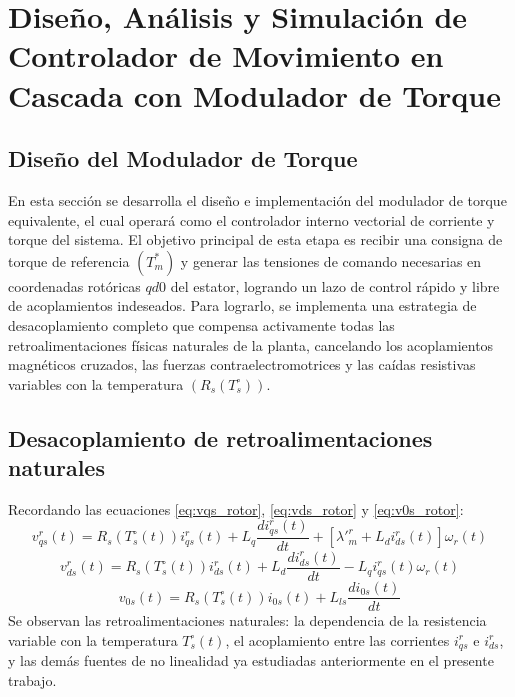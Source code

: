 \documentclass[12pt, a4paper,journal, onecolumn, compsoc]{IEEEtran}
\begin{document}


\section{Diseño, Análisis y Simulación de Controlador de Movimiento en Cascada con Modulador de Torque}
\subsection{Diseño del Modulador de Torque}

En esta sección se desarrolla el diseño e implementación del modulador de torque equivalente, el cual operará como el controlador interno vectorial de corriente y torque del sistema. El objetivo principal de esta etapa es recibir una consigna de torque de referencia $(T_m^*)$ y generar las tensiones de comando necesarias en coordenadas rotóricas \(qd0\) del estator, logrando un lazo de control rápido y libre de acoplamientos indeseados. Para lograrlo, se implementa una estrategia de desacoplamiento completo que compensa activamente todas las retroalimentaciones físicas naturales de la planta, cancelando los acoplamientos magnéticos cruzados, las fuerzas contraelectromotrices y las caídas resistivas variables con la temperatura $(R_s(T_s^\circ))$.
\subsection{Desacoplamiento de retroalimentaciones naturales}
Recordando las ecuaciones \eqref{eq:vqs_rotor}, \eqref{eq:vds_rotor} y \eqref{eq:v0s_rotor}:
    \begin{equation*}
        v^r_{qs}(t)=R_s(T_s^\circ(t))i^r_{qs}(t) + L_q\frac{d i^r_{qs}(t)}{dt}+[\lambda'^r_m + L_d i^r_{ds}(t)]\omega_r(t)
    \end{equation*}
    \begin{equation*}
        v_{ds}^r(t)=R_s(T_s^\circ(t))i^r_{ds}(t)+L_d\frac{d i^r_{ds}(t)}{dt} - L_qi^r_{qs}(t)\omega_r(t)
    \end{equation*}
    \begin{equation*}
        v_{0s}(t)=R_s(T_s^\circ(t))i_{0s}(t)+L_{ls}\frac{d i_{0s}(t)}{dt}
    \end{equation*}
Se observan las retroalimentaciones naturales: la dependencia de la resistencia variable con la temperatura $T_s^\circ(t)$, el acoplamiento entre las corrientes $i_{qs}^r$ e $i_{ds}^r$, y las demás fuentes de no linealidad ya estudiadas anteriormente en el presente trabajo.
\end{document}
